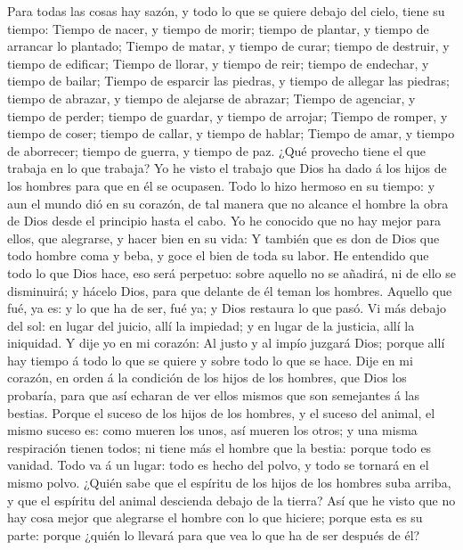  Para todas las cosas hay sazón, y todo lo que se quiere
debajo del cielo, tiene su tiempo:  Tiempo de nacer, y
tiempo de morir; tiempo de plantar, y tiempo de arrancar lo plantado;
 Tiempo de matar, y tiempo de curar; tiempo de destruir, y
tiempo de edificar;  Tiempo de llorar, y tiempo de reir;
tiempo de endechar, y tiempo de bailar;  Tiempo de
esparcir las piedras, y tiempo de allegar las piedras; tiempo de
abrazar, y tiempo de alejarse de abrazar;  Tiempo de
agenciar, y tiempo de perder; tiempo de guardar, y tiempo de arrojar;
 Tiempo de romper, y tiempo de coser; tiempo de callar, y
tiempo de hablar;  Tiempo de amar, y tiempo de aborrecer;
tiempo de guerra, y tiempo de paz.  ¿Qué provecho tiene el
que trabaja en lo que trabaja?  Yo he visto el trabajo
que Dios ha dado á los hijos de los hombres para que en él se ocupasen.
 Todo lo hizo hermoso en su tiempo: y aun el mundo dió en
su corazón, de tal manera que no alcance el hombre la obra de Dios desde
el principio hasta el cabo.  Yo he conocido que no hay
mejor para ellos, que alegrarse, y hacer bien en su vida:
 Y también que es don de Dios que todo hombre coma y
beba, y goce el bien de toda su labor.  He entendido que
todo lo que Dios hace, eso será perpetuo: sobre aquello no se añadirá,
ni de ello se disminuirá; y hácelo Dios, para que delante de él teman
los hombres.  Aquello que fué, ya es: y lo que ha de ser,
fué ya; y Dios restaura lo que pasó.  Vi más debajo del
sol: en lugar del juicio, allí la impiedad; y en lugar de la justicia,
allí la iniquidad.  Y dije yo en mi corazón: Al justo y
al impío juzgará Dios; porque allí hay tiempo á todo lo que se quiere y
sobre todo lo que se hace.  Dije en mi corazón, en orden
á la condición de los hijos de los hombres, que Dios los probaría, para
que así echaran de ver ellos mismos que son semejantes á las bestias.
 Porque el suceso de los hijos de los hombres, y el
suceso del animal, el mismo suceso es: como mueren los unos, así mueren
los otros; y una misma respiración tienen todos; ni tiene más el hombre
que la bestia: porque todo es vanidad.  Todo va á un
lugar: todo es hecho del polvo, y todo se tornará en el mismo polvo.
 ¿Quién sabe que el espíritu de los hijos de los hombres
suba arriba, y que el espíritu del animal descienda debajo de la tierra?
 Así que he visto que no hay cosa mejor que alegrarse el
hombre con lo que hiciere; porque esta es su parte: porque ¿quién lo
llevará para que vea lo que ha de ser después de él?

